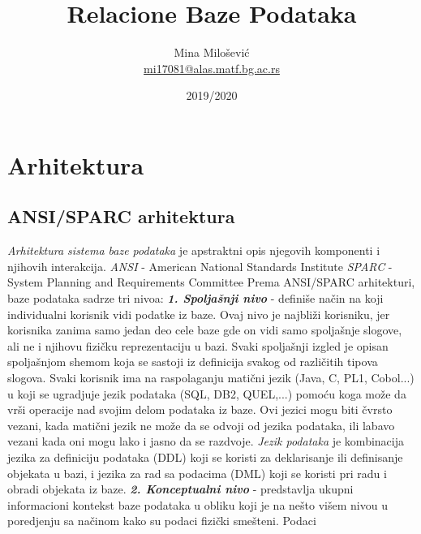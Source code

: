 \documentclass{article}
\title{Relacione Baze Podataka}
\author{Mina Milošević \\
\href{mailto:mi17081@alas.matf.bg.ac.rs}{mi17081@alas.matf.bg.ac.rs}}
\date{2019/2020}
\begin{document}
\maketitle
\newpage

\renewcommand*\contentsname{Sadržaj}
\tableofcontents
\newpage

\section{Arhitektura}

\subsection{ANSI/SPARC arhitektura}
\textit{Arhitektura sistema baze podataka} je apstraktni opis njegovih
komponenti i njihovih interakcija. \newline
\textit{ANSI} - American National Standards Institute \newline
\textit{SPARC} - System Planning and Requirements Committee
\newline
Prema ANSI/SPARC arhitekturi, baze podataka sadrze tri nivoa:
\newline \hspace*{0.2cm}
\textbf{\textit{1. Spoljašnji nivo}} - definiše način na koji
individualni korisnik vidi podatke iz baze. Ovaj nivo je najbliži
korisniku, jer korisnika zanima samo jedan deo cele baze gde on vidi
samo spoljašnje slogove, ali ne i njihovu fizičku reprezentaciju u
bazi. Svaki spoljašnji izgled je opisan spoljašnjom shemom koja se
sastoji iz definicija svakog od različitih tipova
slogova. Svaki korisnik ima na raspolaganju matični jezik (Java, C, 
PL1, Cobol...) u koji se ugradjuje jezik podataka (SQL, DB2, QUEL,...)
pomoću
koga može da vrši operacije nad svojim delom podataka iz baze. Ovi
jezici mogu biti čvrsto vezani, kada matični jezik ne može da se odvoji
od jezika podataka, ili labavo vezani kada oni mogu lako i jasno da se
razdvoje. \newline
\textit{Jezik podataka} je kombinacija jezika za definiciju podataka
(DDL) koji se koristi za deklarisanje ili definisanje objekata u bazi,
i jezika za rad sa podacima (DML) koji se koristi pri radu i obradi
objekata iz baze. 
\newline \hspace*{0.2cm}
\textbf{\textit{2. Konceptualni nivo}} - predstavlja ukupni
informacioni kontekst baze podataka u obliku koji je na nešto višem
nivou u poredjenju sa načinom kako su podaci fizički smešteni. Podaci
\end{document}
